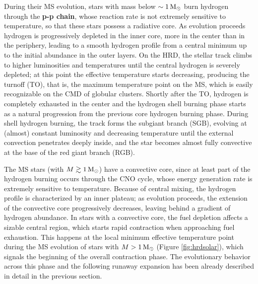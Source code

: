 \documentclass[a4paper,10pt]{article}
\begin{document}
{\noindent}During their MS evolution, stars with mass below $\sim1\,{\rm M_\odot}$ burn hydrogen through the \textbf{p-p chain}, whose reaction rate is not extremely sensitive to temperature, so that these stars possess a radiative core. As evolution proceeds hydrogen is progressively depleted in the inner core, more in the center than in the periphery, leading to a smooth hydrogen profile from a central minimum up to the initial abundance in the outer layers. On the HRD, the stellar track climbs to higher luminosities and temperatures until the central hydrogen is severely depleted; at this point the effective temperature starts decreasing, producing the turnoff (TO), that is, the maximum temperature point on the MS, which is easily recognizable on the CMD of globular clusters. Shortly after the TO, hydrogen is completely exhausted in the center and the hydrogen shell burning phase starts as a natural progression from the previous core hydrogen burning phase. During shell hydrogen burning, the track forms the subgiant branch (SGB), evolving at (almost) constant luminosity and decreasing temperature until the external convection penetrates deeply inside, and the star becomes almost fully convective at the base of the red giant branch (RGB).

{\noindent}The MS stars (with $M\gtrsim1\,{\rm M_\odot}$) have a convective core, since at least part of the hydrogen burning occurs through the CNO cycle, whose energy generation rate is extremely sensitive to temperature. Because of central mixing, the hydrogen profile is characterized by an inner plateau; as evolution proceeds, the extension of the convective core progressively decreases, leaving behind a gradient of hydrogen abundance. In stars with a convective core, the fuel depletion affects a sizable central region, which starts rapid contraction when approaching fuel exhaustion. This happens at the local minimum effective temperature point during the MS evolution of stars with $M>1\,{\rm M_\odot}$ (Figure \ref{fig:hrdsolar}), which signals the beginning of the overall contraction phase. The evolutionary behavior across this phase and the following runaway expansion has been already described in detail in the previous section.
\end{document}
